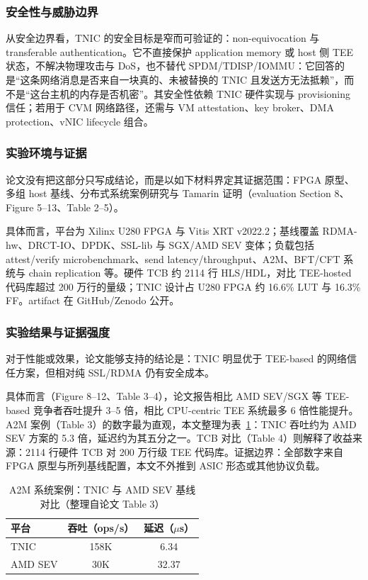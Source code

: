 \documentclass[11pt]{ctexart}
\begin{document}
\subsubsection{安全性与威胁边界}
从安全边界看，TNIC 的安全目标是窄而可验证的：non-equivocation 与 transferable authentication。它不直接保护 application memory 或 host 侧 TEE 状态，不解决物理攻击与 DoS，也不替代 SPDM/TDISP/IOMMU：它回答的是“这条网络消息是否来自一块真的、未被替换的 TNIC 且发送方无法抵赖”，而不是“这台主机的内存是否机密”。其安全性依赖 TNIC 硬件实现与 provisioning 信任；若用于 CVM 网络路径，还需与 VM attestation、key broker、DMA protection、vNIC lifecycle 组合。\par
\subsubsection{实验环境与证据}
论文没有把这部分只写成结论，而是以如下材料界定其证据范围：FPGA 原型、多组 host 基线、分布式系统案例研究与 Tamarin 证明（evaluation Section 8、Figure 5--13、Table 2--5）。\par
具体而言，平台为 Xilinx U280 FPGA 与 Vitis XRT v2022.2；基线覆盖 RDMA-hw、DRCT-IO、DPDK、SSL-lib 与 SGX/AMD SEV 变体；负载包括 attest/verify microbenchmark、send latency/throughput、A2M、BFT/CFT 系统与 chain replication 等。硬件 TCB 约 2114 行 HLS/HDL，对比 TEE-hosted 代码库超过 200 万行的量级；TNIC 设计占 U280 FPGA 约 16.6\% LUT 与 16.3\% FF。artifact 在 GitHub/Zenodo 公开。\par
\subsubsection{实验结果与证据强度}
对于性能或效果，论文能够支持的结论是：TNIC 明显优于 TEE-based 的网络信任方案，但相对纯 SSL/RDMA 仍有安全成本。\par
具体而言（Figure 8--12、Table 3--4），论文报告相比 AMD SEV/SGX 等 TEE-based 竞争者吞吐提升 3--5 倍，相比 CPU-centric TEE 系统最多 6 倍性能提升。A2M 案例（Table 3）的数字最为直观，本文整理为表~\ref{tab:tnic-a2m}：TNIC 吞吐约为 AMD SEV 方案的 5.3 倍，延迟约为其五分之一。TCB 对比（Table 4）则解释了收益来源：2114 行硬件 TCB 对 200 万行级 TEE 代码库。证据边界：全部数字来自 FPGA 原型与所列基线配置，本文不外推到 ASIC 形态或其他协议负载。\par
\begin{table}[htbp]
\centering
\caption{A2M 系统案例：TNIC 与 AMD SEV 基线对比（整理自论文 Table 3）}
\label{tab:tnic-a2m}
\footnotesize
\begin{tabular}{@{}lcc@{}}
\toprule
平台 & 吞吐（ops/s） & 延迟（$\mu$s） \\
\midrule
TNIC & 158K & 6.34 \\
AMD SEV & 30K & 32.37 \\
\bottomrule
\end{tabular}
\end{table}
\end{document}
